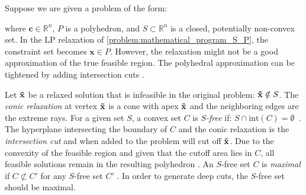 Suppose we are given a problem of the form:
 where $\mathbf c \in \mathbb{R}^n$, $P$ is a polyhedron, and $S \subset \mathbb{R}^n$ is a closed, potentially non-convex set.
In the LP relaxation of \cref{problem:mathematical_program_S_P}, the constraint set becomes $\mathbf x \in P$. However, the relaxation might not be a good approximation of the true feasible region. The polyhedral approximation 
can be tightened by adding intersection cuts \cite{bienstock_outer_product_free_sets}. 

Let $\bold{\tilde x}$ be a relaxed solution that is infeasible in the original problem: $\bold{\tilde x} \notin S$. %
The \textit{conic relaxation} at vertex $\bold{\tilde x}$ is a cone with apex $\bold{\tilde x}$ and the neighboring edges are the extreme rays. For a given set $S$, a convex set $C$ is \textit{$S$-free} if: $S \cap \text{int}(C) = \emptyset$~\cite{bienstock_outer_product_free_sets}. 
The hyperplane intersecting the boundary of $C$ and the conic relaxation is the \textit{intersection cut} and when added to the problem will cut off $\bold{\tilde x}$. Due to the convexity of the feasible region and given that the cutoff area lies in $C$, all feasible solutions remain in the resulting polyhedron %
\cite{musalem_intersection_cuts}.
An $S$-free set $C$ is \textit{maximal} if $C \not \subset C'$ for any $S$-free set $C'$ \cite{bienstock_outer_product_free_sets}. In order to generate deep cuts, the $S$-free set should be maximal. 

